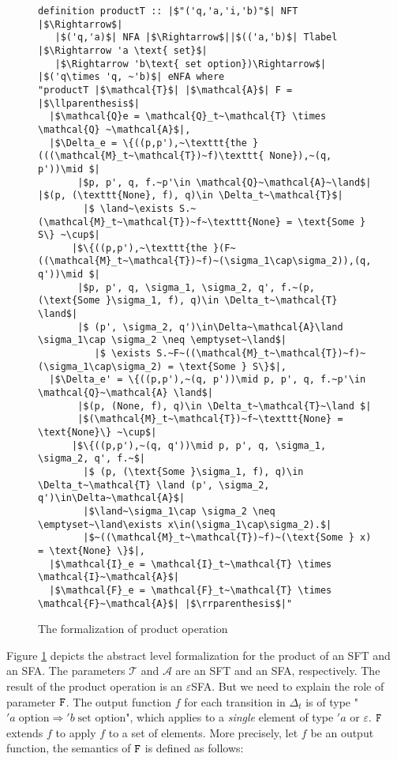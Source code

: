 \documentclass[sigplan,10pt,anonymous,review]{acmart}\settopmatter{printfolios=true,printccs=false,printacmref=false}
\begin{document}
\begin{figure}[hbt!]
	\begin{lstlisting}
definition productT :: |$"('q,'a,'i,'b)"$| NFT |$\Rightarrow$| 
   |$('q,'a)$| NFA |$\Rightarrow$||$(('a,'b)$| Tlabel |$\Rightarrow 'a \text{ set}$| 
   |$\Rightarrow 'b\text{ set option})\Rightarrow$| |$('q\times 'q, ~'b)$| eNFA where
"productT |$\mathcal{T}$| |$\mathcal{A}$| F = |$\llparenthesis$|
  |$\mathcal{Q}e = \mathcal{Q}_t~\mathcal{T} \times \mathcal{Q} ~\mathcal{A}$|,
  |$\Delta_e = \{((p,p'),~\texttt{the }(((\mathcal{M}_t~\mathcal{T})~f)\texttt{ None}),~(q, p'))\mid $|
       |$p, p', q, f.~p'\in \mathcal{Q}~\mathcal{A}~\land$| |$(p, (\texttt{None}, f), q)\in \Delta_t~\mathcal{T}$|
        |$ \land~\exists S.~(\mathcal{M}_t~\mathcal{T})~f~\texttt{None} = \text{Some } S\} ~\cup$|
      |$\{((p,p'),~\texttt{the }(F~((\mathcal{M}_t~\mathcal{T})~f)~(\sigma_1\cap\sigma_2)),(q, q'))\mid $|
       |$p, p', q, \sigma_1, \sigma_2, q', f.~(p, (\text{Some }\sigma_1, f), q)\in \Delta_t~\mathcal{T} \land$|
       |$ (p', \sigma_2, q')\in\Delta~\mathcal{A}\land \sigma_1\cap \sigma_2 \neq \emptyset~\land$|
          |$ \exists S.~F~((\mathcal{M}_t~\mathcal{T})~f)~(\sigma_1\cap\sigma_2) = \text{Some } S\}$|,
  |$\Delta_e' = \{((p,p'),~(q, p'))\mid p, p', q, f.~p'\in \mathcal{Q}~\mathcal{A} \land$|
       |$(p, (None, f), q)\in \Delta_t~\mathcal{T}~\land $|
       |$(\mathcal{M}_t~\mathcal{T})~f~\texttt{None} = \text{None}\} ~\cup$|
      |$\{((p,p'),~(q, q'))\mid p, p', q, \sigma_1, \sigma_2, q', f.~$|
        |$ (p, (\text{Some }\sigma_1, f), q)\in \Delta_t~\mathcal{T} \land (p', \sigma_2, q')\in\Delta~\mathcal{A}$|
        |$\land~\sigma_1\cap \sigma_2 \neq \emptyset~\land\exists x\in(\sigma_1\cap\sigma_2).$|
        |$~((\mathcal{M}_t~\mathcal{T})~f)~(\text{Some } x) = \text{None} \}$|,
  |$\mathcal{I}_e = \mathcal{I}_t~\mathcal{T} \times \mathcal{I}~\mathcal{A}$|
  |$\mathcal{F}_e = \mathcal{F}_t~\mathcal{T} \times \mathcal{F}~\mathcal{A}$| |$\rrparenthesis$|"
	\end{lstlisting}
\caption{The formalization of product operation}
\label{fig-def-FTProd}
\end{figure}

Figure \ref{fig-def-FTProd} depicts the abstract level formalization for the product of an SFT and an SFA. The parameters $\mathcal{T}$ and $\mathcal{A}$ are an SFT and an SFA, respectively. The 
result of the product operation is an $\varepsilon$SFA.
But we need to explain the role of parameter $\text{\texttt{F}}$. The output function $f$ for each transition in $\Delta_t$ is of type "$'a\;\text{option} \Rightarrow 'b\;\text{set option}$", which applies to a \emph{single} element of type $'a$ or $\varepsilon$. $\text{\texttt{F}}$ extends $f$ to apply $f$ to a set of elements. More precisely, let $f$ be an output function, the semantics of $\text{\texttt{F}}$ is defined as follows:
\end{document}
